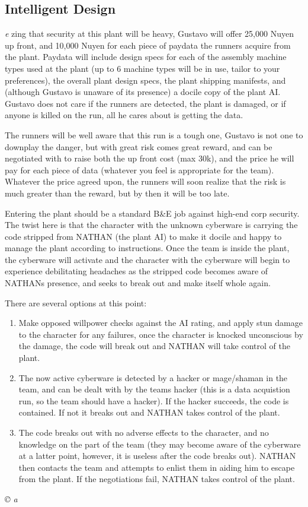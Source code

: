 \documentclass[letterpaper,onecolumn,10pt]{article}
\renewcommand{\textsc}[1]{{\fontspec{Friz Quadrata SC TT}\selectfont #1}}
\newcommand{\getyear}[1]{\StrLeft{#1}{4}}
\newenvironment{scenario}[6]
	{
		\section[#1 {\small\textsc{[#2]}}]{#1} \nopagebreak

		\noindent{\textsc{#2}}\nopagebreak

		\noindent\textit{#3}\nopagebreak
		\def\TMPSCENARIO{{\small\textit{©\getyear{#5}{} #4}}}
	}
	{\TMPSCENARIO}
\begin{document}
\begin{multicols}{2}
\begin{scenario}{Intelligent Design}
Realizing that security at this plant will be heavy, Gustavo will offer 25,000 Nuyen up front, and 10,000 Nuyen for each piece of paydata the runners acquire from the plant. Paydata will include design specs for each of the assembly machine types used at the plant (up to 6 machine types will be in use, tailor to your preferences), the overall plant design specs, the plant shipping manifests, and (although Gustavo is unaware of its presence) a docile copy of the plant AI. Gustavo does not care if the runners are detected, the plant is damaged, or if anyone is killed on the run, all he cares about is getting the data.

The runners will be well aware that this run is a tough one, Gustavo is not one to downplay the danger, but with great risk comes great reward, and can be negotiated with to raise both the up front cost (max 30k), and the price he will pay for each piece of data (whatever you feel is appropriate for the team). Whatever the price agreed upon, the runners will soon realize that the risk is much greater than the reward, but by then it will be too late.

Entering the plant should be a standard B\&E job against high-end corp security. The twist here is that the character with the unknown cyberware is carrying the code stripped from NATHAN (the plant AI) to make it docile and happy to manage the plant according to instructions. Once the team is inside the plant, the cyberware will activate and the character with the cyberware will begin to experience debilitating headaches as the stripped code becomes aware of NATHANs presence, and seeks to break out and make itself whole again.

There are several options at this point:

\begin{enumerate}
\item Make opposed willpower checks against the AI rating, and apply stun damage to the character for any failures, once the character is knocked unconscious by the damage, the code will break out and NATHAN will take control of the plant.

\item The now active cyberware is detected by a hacker or mage/shaman in the team, and can be dealt with by the teams hacker (this is a data acquistion run, so the team should have a hacker). If the hacker succeeds, the code is contained. If not it breaks out and NATHAN takes control of the plant.

\item The code breaks out with no adverse effects to the character, and no knowledge on the part of the team (they may become aware of the cyberware at a latter point, however, it is useless after the code breaks out). NATHAN then contacts the team and attempts to enlist them in aiding him to escape from the plant. If the negotiations fail, NATHAN takes control of the plant.


\end{enumerate}
\end{scenario}
\end{multicols}
\end{document}
